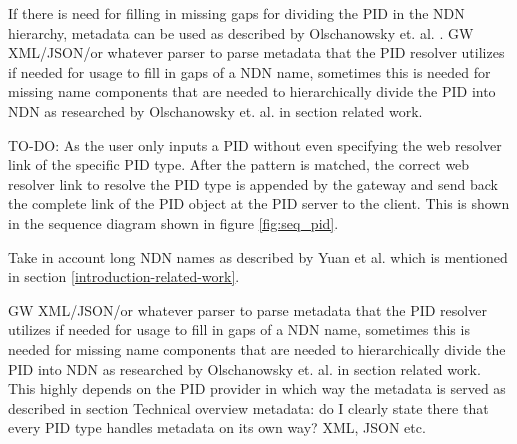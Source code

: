 If there is need for filling in missing gaps for dividing the PID in the NDN hierarchy, metadata can be used as described by Olschanowsky et. al. \cite{ndn-man}.
GW XML/JSON/or whatever parser to parse metadata that the PID resolver utilizes if needed for usage to fill in gaps of a NDN name, sometimes this is needed for missing name components that are needed to hierarchically divide the PID into NDN as researched by Olschanowsky et. al. in section related work. 






TO-DO:
\newline
As the user only inputs a PID without even specifying the web resolver link of the specific PID type. After the pattern is matched, the correct web resolver link to resolve the PID type is appended by the gateway and send back the complete link of the PID object at the PID server to the client. This is shown in the sequence diagram shown in figure \ref{fig:seq_pid}.

Take in account long NDN names as described by Yuan et al. \cite{yuan2012scalable} which is mentioned in section \ref{introduction-related-work}.


GW XML/JSON/or whatever parser to parse metadata that the PID resolver utilizes if needed for usage to fill in gaps of a NDN name, sometimes this is needed for missing name components that are needed to hierarchically divide the PID into NDN as researched by Olschanowsky et. al. in section related work. 
This highly depends on the PID provider in which way the metadata is served as described in section Technical overview metadata: do I clearly state there that every PID type handles metadata on its own way? XML, JSON etc.

